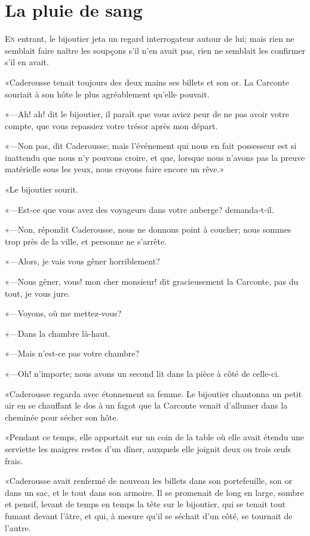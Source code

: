 \chapter{La pluie de sang}

\lettrine{E}{n} entrant, le bijoutier jeta un regard interrogateur autour de lui; mais rien ne semblait faire naître les soupçons s'il n'en avait pas, rien ne semblait les confirmer s'il en avait. 

\zz
«Caderousse tenait toujours des deux mains ses billets et son or. La Carconte souriait à son hôte le plus agréablement qu'elle pouvait. 

«—Ah! ah! dit le bijoutier, il paraît que vous aviez peur de ne pas avoir votre compte, que vous repassiez votre trésor après mon départ. 

«—Non pas, dit Caderousse; mais l'événement qui nous en fait possesseur est si inattendu que nous n'y pouvons croire, et que, lorsque nous n'avons pas la preuve matérielle sous les yeux, nous croyons faire encore un rêve.» 

«Le bijoutier sourit. 

«—Est-ce que vous avez des voyageurs dans votre auberge? demanda-t-il. 

«—Non, répondit Caderousse, nous ne donnons point à coucher; nous sommes trop près de la ville, et personne ne s'arrête. 

«—Alors, je vais vous gêner horriblement? 

«—Nous gêner, vous! mon cher monsieur! dit gracieusement la Carconte, pas du tout, je vous jure. 

«—Voyons, où me mettez-vous? 

«—Dans la chambre là-haut. 

«—Mais n'est-ce pas votre chambre? 

«—Oh! n'importe; nous avons un second lit dans la pièce à côté de celle-ci. 

«Caderousse regarda avec étonnement sa femme. Le bijoutier chantonna un petit air en se chauffant le dos à un fagot que la Carconte venait d'allumer dans la cheminée pour sécher son hôte. 

«Pendant ce temps, elle apportait sur un coin de la table où elle avait étendu une serviette les maigres restes d'un dîner, auxquels elle joignit deux ou trois œufs frais. 

«Caderousse avait renfermé de nouveau les billets dans son portefeuille, son or dans un sac, et le tout dans son armoire. Il se promenait de long en large, sombre et pensif, levant de temps en temps la tête sur le bijoutier, qui se tenait tout fumant devant l'âtre, et qui, à mesure qu'il se séchait d'un côté, se tournait de l'autre. 

